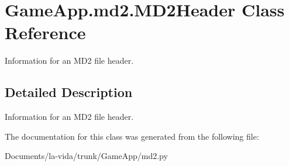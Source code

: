 \hypertarget{classGameApp_1_1md2_1_1MD2Header}{
\section{GameApp.md2.MD2Header Class Reference}
\label{classGameApp_1_1md2_1_1MD2Header}
}
Information for an MD2 file header.  




\subsection{Detailed Description}
Information for an MD2 file header. 

The documentation for this class was generated from the following file:\begin{CompactItemize}
\item 
Documents/la-vida/trunk/GameApp/md2.py\end{CompactItemize}

